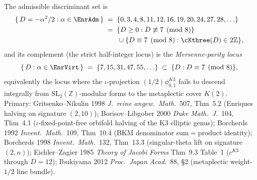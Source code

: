\begin{theorem}
The admissible discriminant set is
\begin{equation}
\label{eq:bkm-enriques-admissible-disc}
\begin{aligned}
 \{\,D = -\alpha^2/2 : \alpha\in\EnrAdm\,\}
 &\;=\;
 \{0, 3, 4, 8, 11, 12, 16, 19, 20, 24, 27, 28, \ldots\} \\
 &\;=\;
 \{D\geq 0 : D\not\equiv 7\pmod{8}\} \\
 &\qquad{}\cup\{D\equiv 7\pmod{8} :
 \cKthree(D)\in 2\mathbb{Z}\},
\end{aligned}
\end{equation}
and its complement (the strict half-integer locus) is the
\emph{Mersenne-parity locus}
\[
 \{\,D : \alpha\in\EnrVirt\,\}
 \;=\;
 \{7, 15, 31, 47, 55, \ldots\}
 \;\subset\;
 \{D : D\equiv 7\pmod 8\},
\]
equivalently the locus where the $\iota$-projection $(1/2)\phi^{K3}_{0,1}$
fails to descend integrally from $\mathrm{SL}_2(\mathbb{Z})$-modular
forms to the metaplectic cover $\widetilde{K(2)}$.
Primary:
Gritsenko--Nikulin 1998 \emph{J.~reine angew.~Math.}~507, Thm~5.2
(Enriques halving on signature $(2,10)$);
Borisov--Libgober 2000 \emph{Duke Math.~J.}~104, Thm~4.1
($\iota$-fixed-point-free orbifold halving of the K3 elliptic genus);
Borcherds 1992 \emph{Invent.~Math.}~109, Thm~10.4
(BKM denominator sum$=$product identity);
Borcherds 1998 \emph{Invent.~Math.}~132, Thm~13.3
(singular-theta lift on signature $(2,n)$);
Eichler--Zagier 1985 \emph{Theory of Jacobi Forms} Thm~9.3 Table~1
($c^{K3}$ through $D=12$);
Ibukiyama 2012 \emph{Proc.~Japan Acad.}~88, \S 2
(metaplectic weight-$1/2$ line bundle).
\end{theorem}

